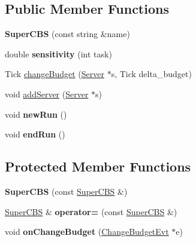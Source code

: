 \subsection*{Public Member Functions}
\begin{DoxyCompactItemize}
\item 
{\bfseries Super\+C\+BS} (const string \&name)\hypertarget{classRTSim_1_1SuperCBS_ae6ea8286f4ee51e41651c79f2af79b57}{}\label{classRTSim_1_1SuperCBS_ae6ea8286f4ee51e41651c79f2af79b57}

\item 
double {\bfseries sensitivity} (int task)\hypertarget{classRTSim_1_1SuperCBS_a861bb81b50abe26585340fcef2c94b41}{}\label{classRTSim_1_1SuperCBS_a861bb81b50abe26585340fcef2c94b41}

\item 
Tick \hyperlink{classRTSim_1_1SuperCBS_a9c0519d592dd55136451e304e6979411}{change\+Budget} (\hyperlink{classRTSim_1_1Server}{Server} $\ast$s, Tick delta\+\_\+budget)
\item 
void \hyperlink{classRTSim_1_1SuperCBS_a9e63d37c47dfa38519f9e9d1e50e9246}{add\+Server} (\hyperlink{classRTSim_1_1Server}{Server} $\ast$s)
\item 
void {\bfseries new\+Run} ()\hypertarget{classRTSim_1_1SuperCBS_a8486ea357290efc2c96875f4fe1d8580}{}\label{classRTSim_1_1SuperCBS_a8486ea357290efc2c96875f4fe1d8580}

\item 
void {\bfseries end\+Run} ()\hypertarget{classRTSim_1_1SuperCBS_a6ca005dc09047a1c0ab36ce68d7bd492}{}\label{classRTSim_1_1SuperCBS_a6ca005dc09047a1c0ab36ce68d7bd492}

\end{DoxyCompactItemize}
\subsection*{Protected Member Functions}
\begin{DoxyCompactItemize}
\item 
{\bfseries Super\+C\+BS} (const \hyperlink{classRTSim_1_1SuperCBS}{Super\+C\+BS} \&)\hypertarget{classRTSim_1_1SuperCBS_ad207660484fb165b1e63a85563fadc3b}{}\label{classRTSim_1_1SuperCBS_ad207660484fb165b1e63a85563fadc3b}

\item 
\hyperlink{classRTSim_1_1SuperCBS}{Super\+C\+BS} \& {\bfseries operator=} (const \hyperlink{classRTSim_1_1SuperCBS}{Super\+C\+BS} \&)\hypertarget{classRTSim_1_1SuperCBS_adf5f666442c82c378a60ac6de4a4d960}{}\label{classRTSim_1_1SuperCBS_adf5f666442c82c378a60ac6de4a4d960}

\item 
void {\bfseries on\+Change\+Budget} (\hyperlink{classRTSim_1_1SuperCBS_1_1ChangeBudgetEvt}{Change\+Budget\+Evt} $\ast$e)\hypertarget{classRTSim_1_1SuperCBS_a88fc9e834ff19b6f7db60fe0b2085d3d}{}\label{classRTSim_1_1SuperCBS_a88fc9e834ff19b6f7db60fe0b2085d3d}

\end{DoxyCompactItemize}
